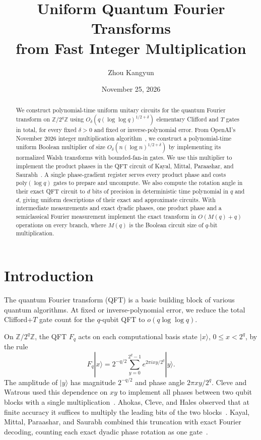 \documentclass[11pt]{article}
\title{\vspace{-1em}\Large\bfseries Uniform Quantum Fourier Transforms\\ from Fast Integer Multiplication}
\author{Zhou Kangyun}\date{\small November 25, 2026}
\newcommand{\CFT}{Clifford+$T$}
\begin{document}
\maketitle
\vspace{-1.45em}
\begin{abstract}
We construct polynomial-time uniform unitary circuits for the quantum Fourier transform on $\mathbb{Z}/2^q\mathbb{Z}$ using $O_\delta(q(\log\log q)^{1/2+\delta})$ elementary Clifford and $T$ gates in total, for every fixed $\delta>0$ and fixed or inverse-polynomial error. From OpenAI's November 2026 integer multiplication algorithm~\cite{openai2026mult}, we construct a polynomial-time uniform Boolean multiplier of size $O_\delta(n(\log n)^{1/2+\delta})$ by implementing its normalized Walsh transforms with bounded-fan-in gates. We use this multiplier to implement the product phases in the QFT circuit of Kayal, Mittal, Paraashar, and Saurabh~\cite{kmps2026}. A single phase-gradient register serves every product phase and costs $\mathrm{poly}(\log q)$ gates to prepare and uncompute. We also compute the rotation angle in their exact QFT circuit to $d$ bits of precision in deterministic time polynomial in $q$ and $d$, giving uniform descriptions of their exact and approximate circuits. With intermediate measurements and exact dyadic phases, one product phase and a semiclassical Fourier measurement implement the exact transform in $O(M(q)+q)$ operations on every branch, where $M(q)$ is the Boolean circuit size of $q$-bit multiplication.
\end{abstract}

\section{Introduction}

The quantum Fourier transform (QFT) is a basic building block of various quantum algorithms. At fixed or inverse-polynomial error, we reduce the total \CFT{} gate count for the $q$-qubit QFT to $o(q\log\log q)$.

On $\mathbb{Z}/2^q\mathbb{Z}$, the QFT $F_q$ acts on each computational basis state $|x\rangle$, $0 \le x < 2^q$, by the rule
\[
F_q|x\rangle = 2^{-q/2}\sum_{y=0}^{2^q-1} e^{2\pi i xy/2^q}|y\rangle.
\]
The amplitude of $|y\rangle$ has magnitude $2^{-q/2}$ and phase angle $2\pi xy/2^q$. Cleve and Watrous used this dependence on $xy$ to implement all phases between two qubit blocks with a single multiplication~\cite{cw2000}. Ahokas, Cleve, and Hales observed that at finite accuracy it suffices to multiply the leading bits of the two blocks~\cite{ach2003}. Kayal, Mittal, Paraashar, and Saurabh combined this truncation with exact Fourier decoding, counting each exact dyadic phase rotation as one gate~\cite{kmps2026}.
\end{document}
